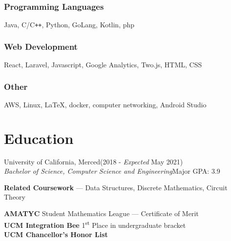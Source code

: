\documentclass[letterpaper,12pt]{article}
\begin{document}
    \subsubsection{Programming Languages}
    Java, C/C\verb!++!, Python, GoLang, Kotlin, php
    \vspace*{-4mm}
    \subsubsection{Web Development}
    React, Laravel, Javascript, Google Analytics, Two.js, HTML, CSS
    \vspace*{-4mm}
    \subsubsection{Other}
    AWS, Linux, \LaTeX, docker, computer networking, Android Studio
    \vspace*{-4mm}
\section{Education}
    University of California, Merced\null\hfill (2018 - \emph{Expected} May 2021)\\
    \emph{Bachelor of Science, Computer Science and Engineering}\null\hfill Major GPA: 3.9
    \begin{center}
        \textbf{Related Coursework} --- Data Structures, Discrete Mathematics, Circuit Theory
    \end{center}
    \textbf{AMATYC} Student Mathematics League --- Certificate of Merit\\
    \textbf{UCM Integration Bee} 1\textsuperscript{st} Place in undergraduate bracket\\
    \textbf{UCM Chancellor's Honor List}
\end{document}
